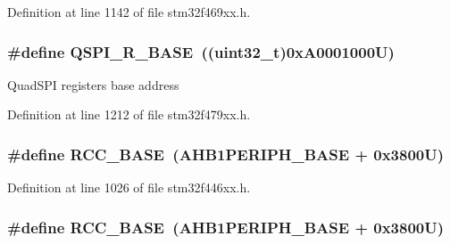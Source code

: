 Definition at line 1142 of file stm32f469xx.\+h.

\subsubsection[{\texorpdfstring{Q\+S\+P\+I\+\_\+\+R\+\_\+\+B\+A\+SE}{QSPI_R_BASE}}]{\setlength{\rightskip}{0pt plus 5cm}\#define Q\+S\+P\+I\+\_\+\+R\+\_\+\+B\+A\+SE~((uint32\+\_\+t)0x\+A0001000\+U)}\hypertarget{group___peripheral__memory__map_ga3b6b7d9c67dec50557fd634505198e9d}{}\label{group___peripheral__memory__map_ga3b6b7d9c67dec50557fd634505198e9d}
Quad\+S\+PI registers base address 

Definition at line 1212 of file stm32f479xx.\+h.

\subsubsection[{\texorpdfstring{R\+C\+C\+\_\+\+B\+A\+SE}{RCC_BASE}}]{\setlength{\rightskip}{0pt plus 5cm}\#define R\+C\+C\+\_\+\+B\+A\+SE~({\bf A\+H\+B1\+P\+E\+R\+I\+P\+H\+\_\+\+B\+A\+SE} + 0x3800\+U)}\hypertarget{group___peripheral__memory__map_ga0e681b03f364532055d88f63fec0d99d}{}\label{group___peripheral__memory__map_ga0e681b03f364532055d88f63fec0d99d}


Definition at line 1026 of file stm32f446xx.\+h.

\subsubsection[{\texorpdfstring{R\+C\+C\+\_\+\+B\+A\+SE}{RCC_BASE}}]{\setlength{\rightskip}{0pt plus 5cm}\#define R\+C\+C\+\_\+\+B\+A\+SE~({\bf A\+H\+B1\+P\+E\+R\+I\+P\+H\+\_\+\+B\+A\+SE} + 0x3800\+U)}\hypertarget{group___peripheral__memory__map_ga0e681b03f364532055d88f63fec0d99d}{}\label{group___peripheral__memory__map_ga0e681b03f364532055d88f63fec0d99d}


